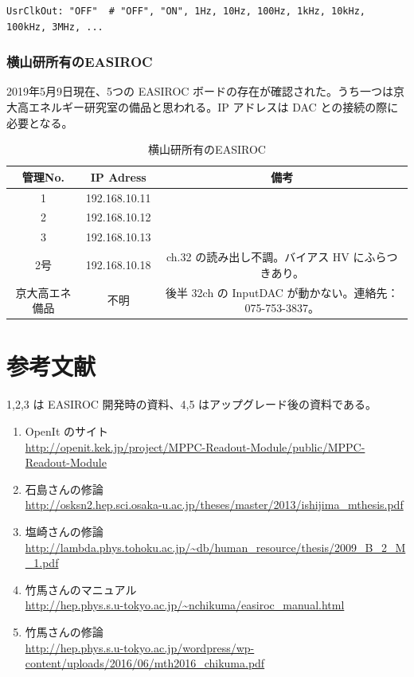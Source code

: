 \documentclass{jsarticle}
\begin{document}
\begin{shadebox}
\begin{verbatim}
UsrClkOut: "OFF"  # "OFF", "ON", 1Hz, 10Hz, 100Hz, 1kHz, 10kHz, 100kHz, 3MHz, ...
\end{verbatim}
\end{shadebox}


\newpage
\subsubsection{横山研所有のEASIROC}
2019年5月9日現在、5つの EASIROC ボードの存在が確認された。うち一つは京大高エネルギー研究室の備品と思われる。IP アドレスは DAC との接続の際に必要となる。
\begin{table}[H]
\begin{center}
\caption{横山研所有のEASIROC}
\begin{tabular}{ccc} \hline
管理No. & IP Adress & 備考 \\ \hline
1 & 192.168.10.11 &  \\ 
2 & 192.168.10.12 &  \\ 
3 & 192.168.10.13 &  \\ 
2号 & 192.168.10.18 & ch.32 の読み出し不調。バイアス HV にふらつきあり。 \\ 
京大高エネ備品 & 不明 & 後半 32ch の InputDAC が動かない。連絡先：075-753-3837。  \\ \hline
\end{tabular}
\end{center}
\end{table}


\newpage
\section{参考文献}
1,2,3 は EASIROC 開発時の資料、4,5 はアップグレード後の資料である。
\begin{enumerate}
\item OpenIt のサイト\\
\url{http://openit.kek.jp/project/MPPC-Readout-Module/public/MPPC-Readout-Module}
\item 石島さんの修論\\
\url{http://osksn2.hep.sci.osaka-u.ac.jp/theses/master/2013/ishijima_mthesis.pdf}
\item 塩崎さんの修論\\
\url{http://lambda.phys.tohoku.ac.jp/~db/human_resource/thesis/2009_B_2_M_1.pdf}
\item 竹馬さんのマニュアル\\
\url{http://hep.phys.s.u-tokyo.ac.jp/~nchikuma/easiroc_manual.html} 
\item 竹馬さんの修論\\
\url{http://hep.phys.s.u-tokyo.ac.jp/wordpress/wp-content/uploads/2016/06/mth2016_chikuma.pdf}
\end{enumerate}
\end{document}

